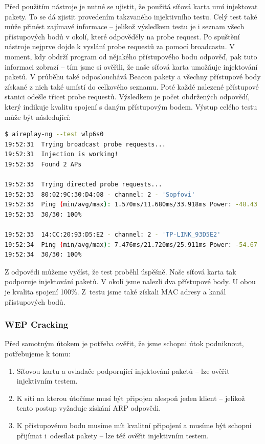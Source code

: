 Před použitím nástroje je nutné se ujistit, že použitá síťová karta umí injektovat pakety. To se dá zjistit provedením takzvaného injektivního testu. Celý test také může přinést zajímavé informace -- jelikož výsledkem testu je i seznam všech přístupových bodů v okolí, které odpověděly na probe request. Po spuštění nástroje nejprve dojde k vyslání probe requestů za pomocí broadcastu. V moment, kdy obdrží program od nějakého přístupového bodu odpověď, pak tuto informaci zobrazí -- tím jsme si ověřili, že naše síťová karta umožňuje injektování paketů. V průběhu také odposlouchává Beacon pakety a všechny přístupové body získané z nich také umístí do celkového seznamu. Poté každé nalezené přístupové stanici odešle třicet probe requestů. Výsledkem je počet obdržených odpovědí, který indikuje kvalitu spojení s daným přístupovým bodem. Výstup celého testu může být následující:
\begin{lstlisting}[language=bash]
$ aireplay-ng --test wlp6s0
19:52:31  Trying broadcast probe requests...
19:52:31  Injection is working!
19:52:33  Found 2 APs

19:52:33  Trying directed probe requests...
19:52:33  80:02:9C:30:D4:08 - channel: 2 - 'Sopfovi'
19:52:33  Ping (min/avg/max): 1.570ms/11.680ms/33.918ms Power: -48.43
19:52:33  30/30: 100%

19:52:33  14:CC:20:93:D5:E2 - channel: 2 - 'TP-LINK_93D5E2'
19:52:34  Ping (min/avg/max): 7.476ms/21.720ms/25.911ms Power: -54.67
19:52:34  30/30: 100%
\end{lstlisting}
Z odpovědi můžeme vyčíst, že test proběhl úspěšně. Naše síťová karta tak podporuje injektování paketů. V okolí jsme nalezli dva přístupové body. U obou je kvalita spojení 100\%. Z~testu jsme také získali MAC adresy a kanál přístupových bodů.

\subsubsection*{WEP Cracking}
Před samotným útokem je potřeba ověřit, že jsme schopni útok podniknout, potřebujeme k tomu:
\begin{enumerate}
  \item{Síťovou kartu a ovladače podporující injektování paketů -- lze ověřit injektivním testem.}
  \item{K síti na kterou útočíme musí být připojen alespoň jeden klient -- jelikož tento postup vyžaduje získání ARP odpovědi.}
  \item{K přístupovému bodu musíme mít kvalitní připojení a musíme být schopni přijímat i~odesílat pakety -- lze též ověřit injektivním testem.}
\end{enumerate}

